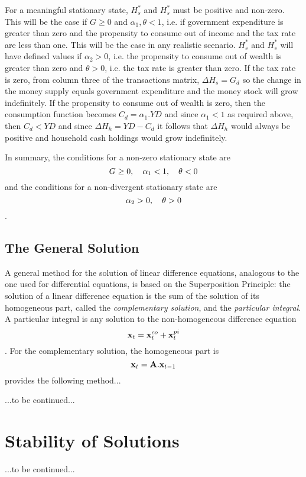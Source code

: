 \documentclass[twoside,a4paper,11pt]{article}
\begin{document}
For a meaningful stationary state, $H_s^*$ and $H_s^*$ must be positive and non-zero. This will be the case  if $G \geq 0$ and $\alpha_1, \theta < 1$, i.e. if government expenditure is greater than zero and the propensity to consume out of income and the tax rate are less than one. This will be the case in any realistic scenario. $H_s^*$ and $H_s^*$ will have defined values if 
$ \alpha_2 > 0$, i.e. the propensity to consume out of wealth is greater than zero and $\theta>0$, i.e. the tax rate is greater than zero. If the tax rate is zero, from column three of the transactions matrix, $\Delta H_s = G_d$ so the change in the money supply equals government expenditure and the money stock will grow indefinitely. If the propensity to consume out of wealth is zero, then the consumption function becomes
$C_d  = \alpha_1.YD$ and since $\alpha_1<1$ as required above, then $C_d  < YD$ and since
$\Delta H_h = YD - C_d$ it follows that $\Delta H_h$ would always be positive and household cash holdings would grow indefinitely.

In summary, the conditions for a non-zero stationary state are
$$ G \geq 0, \text{\hspace{10pt}} \alpha_1 < 1, \text{\hspace{10pt}} \theta < 0$$
and the conditions for a non-divergent stationary state are
$$ \alpha_2 > 0, \text{\hspace{10pt}} \theta > 0$$.
\subsection{The General Solution}
A general method for the solution of linear difference equations, analogous to the one used for differential equations, is based on the Superposition Principle: the solution of a linear difference equation is
the sum of the solution of its homogeneous part, called the \emph{complementary solution}, and the
\emph{particular integral}. A particular integral is any solution to the non-homogeneous difference equation
$$ \mathbf{x}_{t} = \mathbf{x}_{t}^{co} + \mathbf{x}_{t}^{pi}$$.
For the complementary solution, the homogeneous part is
$$\mathbf{x}_t = \mathbf{A}.\mathbf{x}_{t-1}$$
\cite[]{gandolfo1997} provides the following method...
\begin{center}
...to be continued...
\end{center}

\section{Stability of Solutions}
\begin{center}
...to be continued...
\end{center}



\end{document}
